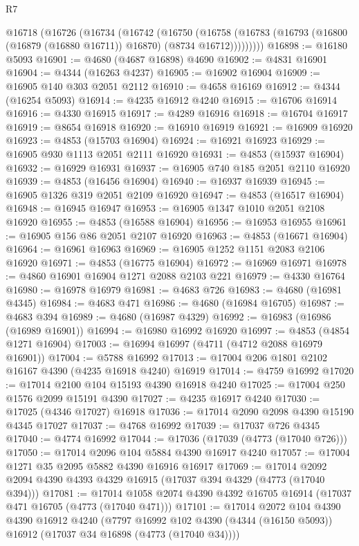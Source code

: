 \begin{lexlean}{R7}
\begin{coremodule}
    @16718
      (@16726
        (@16734
          (@16742
            (@16750
              (@16758
                (@16783 (@16793 (@16800 (@16879 (@16880 @16711)) @16870) (@8734 @16712)))))))))
@16898 := @16180 @5093
@16901 := @4680 (@4687 @16898) @4690
@16902 := @4831 @16901
@16904 := @4344 (@16263 @4237)
@16905 := @16902 @16904
@16909 := @16905 @140 @303 @2051 @2112
@16910 := @4658 @16169
@16912 := @4344 (@16254 @5093)
@16914 := @4235 @16912 @4240
@16915 := @16706 @16914
@16916 := @4330 @16915
@16917 := @4289 @16916
@16918 := @16704 @16917
@16919 := @8654 @16918
@16920 := @16910 @16919
@16921 := @16909 @16920
@16923 := @4853 (@15703 @16904)
@16924 := @16921 @16923
@16929 := @16905 @930 @1113 @2051 @2111 @16920
@16931 := @4853 (@15937 @16904)
@16932 := @16929 @16931
@16937 := @16905 @740 @185 @2051 @2110 @16920
@16939 := @4853 (@16456 @16904)
@16940 := @16937 @16939
@16945 := @16905 @1326 @319 @2051 @2109 @16920
@16947 := @4853 (@16517 @16904)
@16948 := @16945 @16947
@16953 := @16905 @1347 @1010 @2051 @2108 @16920
@16955 := @4853 (@16588 @16904)
@16956 := @16953 @16955
@16961 := @16905 @156 @86 @2051 @2107 @16920
@16963 := @4853 (@16671 @16904)
@16964 := @16961 @16963
@16969 := @16905 @1252 @1151 @2083 @2106 @16920
@16971 := @4853 (@16775 @16904)
@16972 := @16969 @16971
@16978 := @4860 @16901 @16904 @1271 @2088 @2103 @221
@16979 := @4330 @16764
@16980 := @16978 @16979
@16981 := @4683 @726
@16983 := @4680 (@16981 @4345)
@16984 := @4683 @471
@16986 := @4680 (@16984 @16705)
@16987 := @4683 @394
@16989 := @4680 (@16987 @4329)
@16992 := @16983 (@16986 (@16989 @16901))
@16994 := @16980 @16992 @16920
@16997 := @4853 (@4854 @1271 @16904)
@17003 := @16994 @16997 (@4711 (@4712 @2088 @16979 @16901))
@17004 := @5788 @16992
@17013 := @17004 @206 @1801 @2102 @16167 @4390 (@4235 @16918 @4240) @16919
@17014 := @4759 @16992
@17020 := @17014 @2100 @104 @15193 @4390 @16918 @4240
@17025 := @17004 @250 @1576 @2099 @15191 @4390
@17027 := @4235 @16917 @4240
@17030 := @17025 (@4346 @17027) @16918
@17036 := @17014 @2090 @2098 @4390 @15190 @4345 @17027
@17037 := @4768 @16992
@17039 := @17037 @726 @4345
@17040 := @4774 @16992
@17044 := @17036 (@17039 (@4773 (@17040 @726)))
@17050 := @17014 @2096 @104 @5884 @4390 @16917 @4240
@17057 := @17004 @1271 @35 @2095 @5882 @4390 @16916 @16917
@17069 := @17014 @2092 @2094 @4390 @4393 @4329 @16915 (@17037 @394 @4329 (@4773 (@17040 @394)))
@17081 := @17014 @1058 @2074 @4390 @4392 @16705 @16914 (@17037 @471 @16705 (@4773 (@17040 @471)))
@17101 := @17014
    @2072
    @104
    @4390
    @4390
    @16912
    @4240
    (@7797 @16992 @102 @4390 (@4344 (@16150 @5093)) @16912 (@17037 @34 @16898 (@4773 (@17040 @34))))

\end{coremodule}
\end{lexlean}

